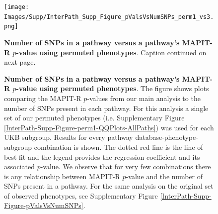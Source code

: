 \documentclass[10pt,a4paper]{article}
\def\log{{\rm log}}
\begin{document}
\setlength{\footskip}{3cm}
\begin{figure}[htbp]
\centering
\vspace*{-2cm}
\texttt{[image: Images/Supp/InterPath\_Supp\_Figure\_pValsVsNumSNPs\_perm1\_vs3.png]}
\caption[TBD]{\textbf{Number of SNPs in a pathway versus a pathway's MAPIT-R $p$-value using permuted phenotypes}. Caption continued on next page.}
\label{InterPath-Supp-Figure-pValsVsNumSNPs-perm1}
\end{figure}
\clearpage
\setlength{\footskip}{1cm}

\addtocounter{figure}{-1}
\begin{figure} [t!]
  \caption{\textbf{Number of SNPs in a pathway versus a pathway's MAPIT-R $p$-value using permuted phenotypes}. The figure shows plots comparing the MAPIT-R $p$-values from our main analysis to the number of SNPs present in each pathway. For this analysis a single set of our permuted phenotypes (i.e. Supplementary Figure \ref{InterPath-Supp-Figure-perm1-QQPlots-AllPaths}) was used for each UKB subgroup. Results for every pathway database-phenotype-subgroup combination is shown. The dotted red line is the line of best fit and the legend provides the regression coefficient and its associated $p$-value. We observe that for very few combinations there is any relationship between MAPIT-R $p$-value and the number of SNPs present in a pathway. For the same analysis on the original set of observed phenotypes, see Supplementary Figure \ref{InterPath-Supp-Figure-pValsVsNumSNPs}.}
\label{InterPath-Supp-Figure-pValsVsNumSNPs-perm1-Caption}
\end{figure}
\clearpage

\end{document}
